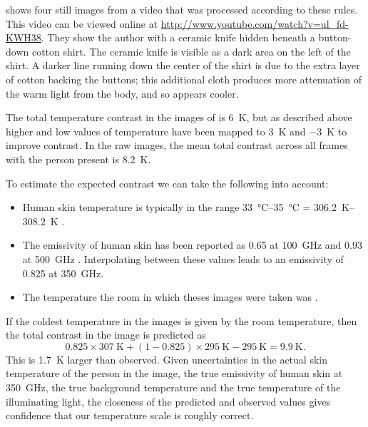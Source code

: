  shows four still images from a video that was processed according to these rules.
This video can be viewed online at \url{http://www.youtube.com/watch?v=ul_fd-KWH38}. %
They show the author with a ceramic knife hidden beneath a button-down cotton shirt.
The ceramic knife is visible as a dark area on the left of the shirt.
A darker line running down the center of the shirt is due to the extra layer of cotton backing the buttons; this additional cloth produces more attenuation of the warm light from the body, and so appears cooler.

The total temperature contrast in the images of  is \SI{6}{\K}, but as described above higher and low values of temperature have been mapped to \SI{+3}{\K} and \SI{-3}{\K} to improve contrast.
In the raw images, the mean total contrast across all frames with the person present is \SI{8.2}{\K}.

To estimate the expected contrast we can take the following into account:
\begin{itemize}
  \item Human skin temperature is typically in the range \SIrange{33}{35}{\celsius} = \SIrange{306.2}{308.2}{\K} \cite{ramanathan_new_1964}.
  \item The emissivity of human skin has been reported as \num{0.65} at \SI{100}{\GHz} and \num{0.93} at \SI{500}{\GHz} \cite{appleby_standoff_2007}.
        Interpolating between these values leads to an emissivity of \num{0.825} at \SI{350}{\GHz}.
  \item The temperature the room in which theses images were taken was .
\end{itemize}
If the coldest temperature in the images is given by the room temperature, then the total contrast in the image is predicted as
\begin{equation} \label{eqn:ch7-pred-contrast}
  0.825 \times \SI{307}{\K} + (1 - 0.825) \times \SI{295}{\K} - \SI{295}{\K} =  \SI{9.9}{\K}.
\end{equation}
This is \SI{1.7}{\K} larger than observed.
Given uncertainties in the actual skin temperature of the person in the image, the true emissivity of human skin at \SI{350}{\GHz}, the true background temperature and the true temperature of the illuminating light, the closeness of the predicted and observed values gives confidence that our temperature scale is roughly correct.

